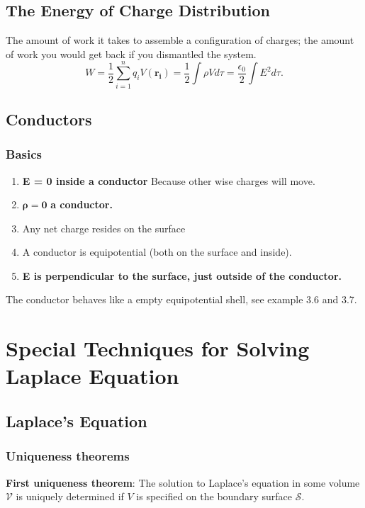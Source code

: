 \documentclass{report}
\begin{document}
\section{The Energy of Charge Distribution}

The amount of work it takes to assemble a configuration of charges; the amount of work you would get back if you dismantled the system. 
\begin{equation}
    W = \frac{1}{2}\sum_{i=1}^n q_i V(\mathbf{r_i}) = \frac{1}{2} \int \rho V d \tau = \frac{\epsilon_0}{2} \int E^2 d \tau. 
\end{equation}


\section{Conductors}
\subsection{Basics}
\begin{enumerate}
    \item \textbf{E = 0 inside a conductor} Because other wise charges will move. 
    \item $\mathbf{\rho = 0}$ \textbf{ a conductor. }
    \item Any net charge resides on the surface
    \item A conductor is equipotential (both on the surface and inside).
    \item \textbf{E is perpendicular to the surface, just outside of the conductor. }
\end{enumerate}

The conductor behaves like a empty equipotential shell, see example 3.6 and 3.7. 


\chapter{Special Techniques for Solving Laplace Equation}
\section{Laplace's Equation}
\subsection{Uniqueness theorems}
\textbf{First uniqueness theorem}: The solution to Laplace's equation in some volume $\mathcal{V}$ is uniquely determined if $V$ is specified on the boundary surface $\mathcal{S}$. 
\end{document}

